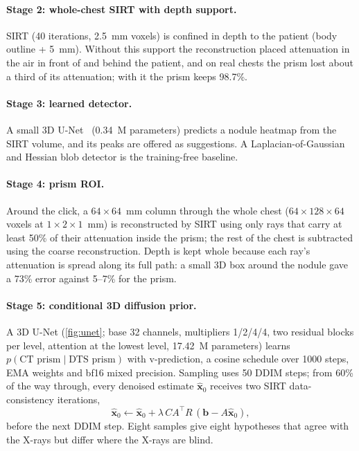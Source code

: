 \paragraph{Stage 2: whole-chest SIRT with depth support.} SIRT (40 iterations, 2.5~mm voxels) is confined in depth to the patient (body outline + 5~mm). Without this support the reconstruction placed attenuation in the air in front of and behind the patient, and on real chests the prism lost about a third of its attenuation; with it the prism keeps 98.7\%.

\paragraph{Stage 3: learned detector.} A small 3D U-Net~\cite{cicek2016unet} (0.34~M parameters) predicts a nodule heatmap from the SIRT volume, and its peaks are offered as suggestions. A Laplacian-of-Gaussian and Hessian blob detector is the training-free baseline.

\paragraph{Stage 4: prism ROI.} Around the click, a $64\times64$~mm column through the whole chest ($64\times128\times64$ voxels at $1\times2\times1$~mm) is reconstructed by SIRT using only rays that carry at least 50\% of their attenuation inside the prism; the rest of the chest is subtracted using the coarse reconstruction. Depth is kept whole because each ray's attenuation is spread along its full path: a small 3D box around the nodule gave a 73\% error against 5--7\% for the prism.

\paragraph{Stage 5: conditional 3D diffusion prior.} A 3D U-Net (\cref{fig:unet}; base 32 channels, multipliers 1/2/4/4, two residual blocks per level, attention at the lowest level, 17.42~M parameters) learns $p(\text{CT prism}\mid\text{DTS prism})$ with v-prediction, a cosine schedule over 1000 steps, EMA weights and bf16 mixed precision. Sampling uses 50 DDIM steps; from 60\% of the way through, every denoised estimate $\hat{\mathbf{x}}_0$ receives two SIRT data-consistency iterations,
\begin{equation}
  \hat{\mathbf{x}}_0 \leftarrow \hat{\mathbf{x}}_0 + \lambda\, C A^{\top} R\,(\mathbf{b} - A\hat{\mathbf{x}}_0),
\end{equation}
before the next DDIM step. Eight samples give eight hypotheses that agree with the X-rays but differ where the X-rays are blind.



